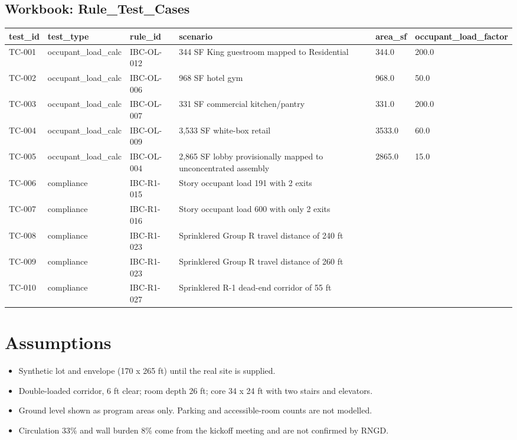 \documentclass[10pt]{article}
\begin{document}
\subsection{Workbook: Rule\_Test\_Cases}
\begin{longtable}{p{3cm}p{3cm}p{3cm}p{3cm}p{3cm}p{3cm}}
\toprule
test\_id & test\_type & rule\_id & scenario & area\_sf & occupant\_load\_factor \\ \midrule \endhead
TC-001 & occupant\_load\_calc & IBC-OL-012 & 344 SF King guestroom mapped to Residential & 344.0 & 200.0 \\
TC-002 & occupant\_load\_calc & IBC-OL-006 & 968 SF hotel gym & 968.0 & 50.0 \\
TC-003 & occupant\_load\_calc & IBC-OL-007 & 331 SF commercial kitchen/pantry & 331.0 & 200.0 \\
TC-004 & occupant\_load\_calc & IBC-OL-009 & 3,533 SF white-box retail & 3533.0 & 60.0 \\
TC-005 & occupant\_load\_calc & IBC-OL-004 & 2,865 SF lobby provisionally mapped to unconcentrated assembly & 2865.0 & 15.0 \\
TC-006 & compliance & IBC-R1-015 & Story occupant load 191 with 2 exits &  &  \\
TC-007 & compliance & IBC-R1-016 & Story occupant load 600 with only 2 exits &  &  \\
TC-008 & compliance & IBC-R1-023 & Sprinklered Group R travel distance of 240 ft &  &  \\
TC-009 & compliance & IBC-R1-023 & Sprinklered Group R travel distance of 260 ft &  &  \\
TC-010 & compliance & IBC-R1-027 & Sprinklered R-1 dead-end corridor of 55 ft &  &  \\
\bottomrule\end{longtable}

\section{Assumptions}
\begin{itemize}
\item Synthetic lot and envelope (170 x 265 ft) until the real site is supplied.
\item Double-loaded corridor, 6 ft clear; room depth 26 ft; core 34 x 24 ft with two stairs and elevators.
\item Ground level shown as program areas only. Parking and accessible-room counts are not modelled.
\item Circulation 33\% and wall burden 8\% come from the kickoff meeting and are not confirmed by RNGD.
\end{itemize}
\end{document}
